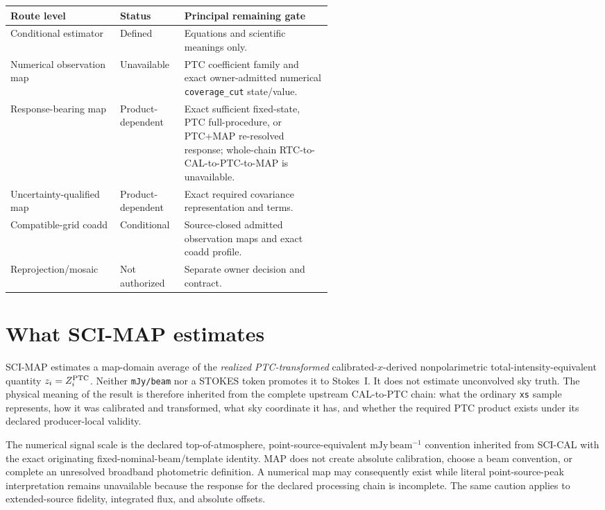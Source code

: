 \documentclass[10pt]{article}
\newcommand{\code}[1]{\nolinkurl{#1}}
\newcommand{\mjybeam}{\mathrm{mJy\,beam^{-1}}}
\begin{document}
\begin{center}\small
\begin{tabularx}{0.96\linewidth}{@{}L{0.34\linewidth}L{0.20\linewidth}Y@{}}
\toprule Route level & Status & Principal remaining gate \\
\midrule
Conditional estimator & Defined & Equations and scientific meanings only.\\
Numerical observation map & Unavailable & PTC coefficient family and exact owner-admitted numerical \code{coverage_cut} state/value.\\
Response-bearing map & Product-dependent & Exact sufficient fixed-state, PTC full-procedure, or PTC+MAP re-resolved response; whole-chain RTC-to-CAL-to-PTC-to-MAP is unavailable.\\
Uncertainty-qualified map & Product-dependent & Exact required covariance representation and terms.\\
Compatible-grid coadd & Conditional & Source-closed admitted observation maps and exact coadd profile.\\
Reprojection/mosaic & Not authorized & Separate owner decision and contract.\\
\bottomrule
\end{tabularx}
\end{center}

\tableofcontents

\clearpage
\section{What SCI-MAP estimates}\label{sec:estimand}
SCI-MAP estimates a map-domain average of the \emph{realized PTC-transformed}
calibrated-\(x\)-derived nonpolarimetric total-intensity-equivalent quantity
\(z_i=Z_i^{\rm PTC}\). Neither \code{mJy/beam} nor a STOKES token promotes it
to Stokes~I. It does not estimate unconvolved sky truth. The physical
meaning of the result is therefore inherited from the complete upstream
CAL-to-PTC chain: what the ordinary \code{xs} sample represents, how it was
calibrated and transformed, what sky coordinate it has, and whether the
required PTC product exists under its declared producer-local validity.

The numerical signal scale is the declared top-of-atmosphere,
point-source-equivalent \(\mjybeam\) convention inherited from SCI-CAL with
the exact originating fixed-nominal-beam/template identity. MAP does not create absolute
calibration, choose a beam convention, or complete an unresolved broadband
photometric definition. A numerical map may consequently exist while literal
point-source-peak interpretation remains unavailable because the response for
the declared processing chain is incomplete. The same caution applies to
extended-source fidelity, integrated flux, and absolute offsets.
\end{document}
